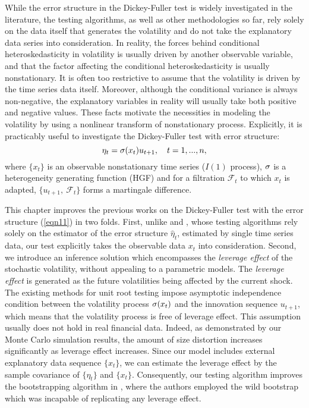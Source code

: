 While the error structure  in the Dickey-Fuller test is widely investigated in the literature, the testing algorithms, as well as other methodologies so far,  rely solely on the  data itself that generates the volatility  and do not  take the explanatory data series into consideration. In reality, the forces behind conditional heteroskedasticity in volatility is usually driven by another observable variable, and that the factor affecting the conditional heteroskedasticity is usually nonstationary. It is often too restrictive to assume that the volatility  is driven by the time series data itself. Moreover, although the conditional variance is always non-negative, the explanatory variables in reality will usually take both positive and negative values. These facts motivate the necessities in  modeling the volatility by using a nonlinear transform of nonstationary process. Explicitly, it is practicably useful to investigate  the Dickey-Fuller
 test with  error structure:
\begin{equation} \la{eqn11}
\eta_{t} = \si (x_{t}) u_{t+1}, \quad t=1,...,n,
\end{equation}
where $\{x_{t}\}$ is an observable  nonstationary time series ($I(1)$ process), $\sigma$ is  a heterogeneity generating
function (HGF) and for a filtration $\mathcal{F}_{t}$ to which $x_{t}$
is adapted, $\{u_{t+1},\ {\mathcal{F}_{t}}\}$ forms a martingale
difference.

This chapter improves the previous works on the Dickey-Fuller test with the error structure (\ref {eqn11}) in two folds. First,
unlike  \cite{boswijk2005} and \cite{cavalieretaylor2009}, whose testing algorithms rely solely on the estimator of the error structure $\widehat{\eta}_{t}$, estimated by single time series data, our test explicitly takes the observable data $x_{t}$ into consideration.
Second, we introduce an inference solution which encompasses the \textit{leverage effect} of the stochastic volatility, without appealing to a parametric models. The \textit{leverage effect} is generated as the future volatilities being affected by the current shock. The existing methods for unit root testing  impose asymptotic independence condition between the  volatility process $\sigma(x_{t})$ and the innovation sequence $u_{t+1}$, which means that the volatility process is free of leverage effect. This assumption usually does not hold in real  financial data. Indeed, as demonstrated by our Monte Carlo simulation results, the amount of size distortion increases significantly as leverage effect increases.
Since our model includes external explanatory data sequence $\{x_{t}\}$, we can estimate the leverage effect by the sample covariance of $\{ \eta_{t}\}$ and $\{ x_{t}\}$. Consequently, our testing algorithm improves the bootstrapping algorithm in \cite{cavalieretaylor2009}, where the authors employed the wild bootstrap which was incapable of replicating any leverage effect.

